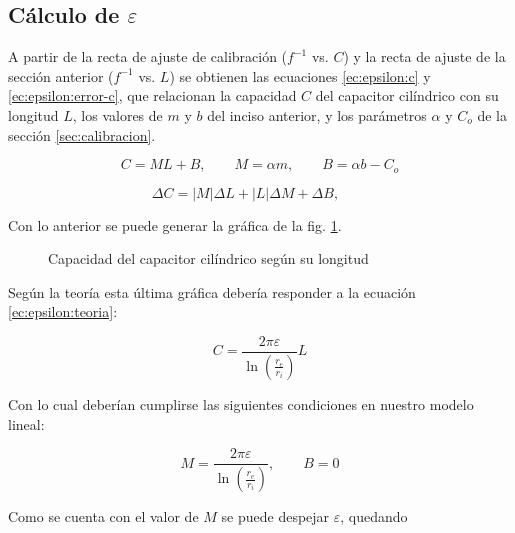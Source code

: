 \subsection{Cálculo de $\varepsilon$}

A partir de la recta de ajuste de calibración ($f^{-1}$ vs. $C$) y la recta de
ajuste de la sección anterior ($f^{-1}$ vs. $L$) se obtienen las ecuaciones
\ref{ec:epsilon:c} y \ref{ec:epsilon:error-c}, que relacionan la capacidad $C$
del capacitor cilíndrico con su longitud $L$, los valores de $m$ y $b$ del
inciso anterior, y los parámetros $\alpha$ y $C_o$ de la sección
\ref{sec:calibracion}.

\begin{equation}
    \label{ec:epsilon:c}
    C = ML + B,\quad\quad
    M = \alpha m, \quad\quad
    B = \alpha b - C_o
\end{equation}

\begin{equation}
    \label{ec:epsilon:error-c}
    \Delta C = \left| M \right| \Delta L 
             + \left| L \right| \Delta M
             + \Delta B, \quad\quad
\end{equation}

\vspace{10mm}
Con lo anterior se puede generar la gráfica de la fig. 
\ref{fig:epsilon:cvsl}.

\begin{figure}[H]
    \centering
    
    \caption{Capacidad del capacitor cilíndrico según su longitud}
    \label{fig:epsilon:cvsl}
\end{figure}

\vspace{10mm}
Según la teoría esta última gráfica debería responder a la ecuación 
\ref{ec:epsilon:teoria}:

\begin{equation}
    \label{ec:epsilon:teoria}
    C = \frac{2\pi\varepsilon}{\ln\left(\frac{r_e}{r_i}\right)} L
\end{equation}

\vspace{5mm}
Con lo cual deberían cumplirse las siguientes condiciones en nuestro modelo
lineal:

\[
    M = \frac{2\pi\varepsilon}{\ln\left(\frac{r_e}{r_i}\right)}, 
    \quad\quad B = 0
\]

\vspace{5mm}
Como se cuenta con el valor de $M$ se puede despejar $\varepsilon$, quedando

